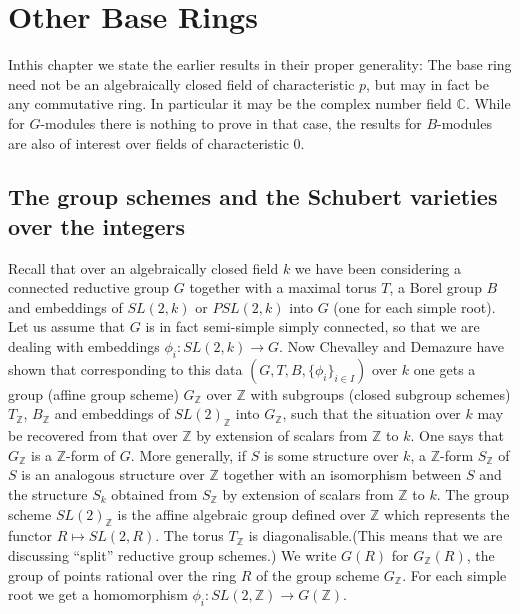 \chapter{Other Base Rings}\label{chap7}

In\pageoriginale this\label{page68} chapter we state the earlier results in their
proper generality: The base ring need not be an algebraically closed
field of characteristic $p$, but may in fact be any commutative
ring. In particular it may be the complex number field
$\mathbb{C}$. While for $G$-modules there is nothing to prove in that
case, the results for $B$-modules are also of interest over fields of
characteristic $0$.

\section[The group schemes and the Schubert varieties...]{The group
  schemes and the Schubert varieties over the 
  integers}\label{chap7-sec7.1}  

Recall that over an algebraically closed field $k$ we have been
considering a connected reductive group $G$ together with a maximal
torus $T$, a Borel group $B$ and embeddings of $SL(2,k)$ or $PSL(2,k)$
into $G$ (one for each simple root). Let us assume that $G$ is in fact
semi-simple simply connected, so that we are dealing with embeddings
$\phi_{i}:SL(2,k)\to G$. Now Chevalley and Demazure have shown that
corresponding to this data $(G,T,B,\{\phi_{i}\}_{i\in I})$ over $k$
one gets a group (affine group scheme) $G_{\mathbb{Z}}$ over
$\mathbb{Z}$ with subgroups (closed subgroup schemes)
$T_{\mathbb{Z}}$, $B_{\mathbb{Z}}$ and embeddings of
$SL(2)_{\mathbb{Z}}$ into $G_{\mathbb{Z}}$, such that the situation
over $k$ may be recovered from that over $\mathbb{Z}$ by extension of
scalars from $\mathbb{Z}$ to $k$. One says that $G_{\mathbb{Z}}$ is a
$\mathbb{Z}$-form of $G$. More generally, if $S$ is some structure
over $k$, a $\mathbb{Z}$-form $S_{\mathbb{Z}}$ of $S$ is an analogous
structure over $\mathbb{Z}$ together with an isomorphism between $S$
and the structure $S_{k}$ obtained from $S_{\mathbb{Z}}$ by extension
of scalars from $\mathbb{Z}$ to $k$. The group scheme
$SL(2)_{\mathbb{Z}}$ is the affine algebraic group defined over
$\mathbb{Z}$ which represents the functor $R\mapsto SL(2,R)$. The
torus $T_{\mathbb{Z}}$ is diagonalisable.\pageoriginale (This\label{page69} means
that we are discussing ``split'' reductive group schemes.) We write
$G(R)$ for $G_{\mathbb{Z}}(R)$, the group of points rational over the
ring $R$ of the group scheme $G_{\mathbb{Z}}$. For each simple root we
get a homomorphism $\phi_{i}:SL(2,\mathbb{Z})\to G(\mathbb{Z})$. 

